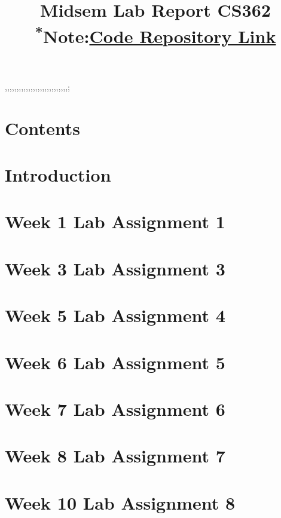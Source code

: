 ,,,,,,,,,,,,,,,,,,,,,,,,,,,;\documentclass[conference]{IEEEtran}
\begin{document}
\title{Midsem Lab Report CS362\\
{{\footnotesize \textsuperscript{*}Note:\textbf{\href{https://github.com/darshh311/CS362_lab}{Code Repository Link}}}}
}

\author{
\and
{}
}
\maketitle


\section*{Contents}
\section*{\textbf{Introduction}}
\section*{\textbf{Week 1 Lab Assignment 1}}
\section*{\textbf{Week 3 Lab Assignment 3}}
\section*{\textbf{Week 5 Lab Assignment 4}}
\section*{\textbf{Week 6 Lab Assignment 5}}
\section*{\textbf{Week 7 Lab Assignment 6}}
\section*{\textbf{Week 8 Lab Assignment 7}}
\section*{\textbf{Week 10 Lab Assignment 8}}
\end{document}
